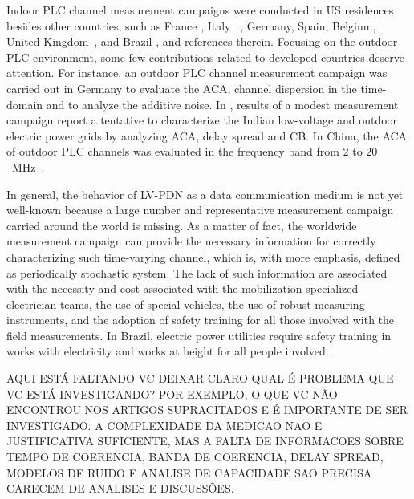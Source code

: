 \documentclass[journal]{IEEEtran}
\begin{document}
Indoor \ac{PLC} channel measurement campaigns were conducted in US residences \cite{Liu1999, O'Mahony2006} besides other countries, such as France \cite{Tlich2008,Tlich2008a,Schneider2012}, Italy ~\cite{Tonello2014}, Germany, Spain, Belgium, United Kingdom~\cite{Schneider2012}, and Brazil \cite{Oliveira2017}, and references therein. Focusing on the outdoor \ac{PLC} environment, some few contributions related to developed countries deserve attention. For instance, an outdoor \ac{PLC} channel measurement campaign was carried out in Germany to evaluate the \ac{ACA}, channel dispersion in the time-domain and to analyze the additive noise. In \cite{Prasad2001}, results of a modest measurement campaign report a tentative to characterize the Indian low-voltage and outdoor electric power grids by analyzing  \ac{ACA}, delay spread and \ac{CB}. In China, the \ac{ACA} of outdoor \ac{PLC} channels was evaluated in the frequency band from $2$ to $20$~MHz~\cite{Zhai2011}.\color{black}

\color{red} In general, the behavior of \ac{LV-PDN} as a data communication medium is not yet well-known because a large number and representative measurement campaign carried around the world is missing. As a matter of fact, the worldwide measurement campaign can provide the necessary information for correctly characterizing such time-varying channel, which is, with more emphasis, defined as periodically stochastic system. The lack of such information are associated with the necessity and cost associated with the mobilization specialized electrician teams, the use of special vehicles, the use of robust measuring instruments, and the adoption of safety training for all those involved with the field measurements. In Brazil, electric power utilities require safety training in works with electricity \cite{NR10} and works at height \cite{NR35} for all people involved. 

AQUI ESTÁ FALTANDO VC DEIXAR CLARO QUAL É PROBLEMA QUE VC ESTÁ INVESTIGANDO? POR EXEMPLO, O QUE VC NÃO ENCONTROU NOS ARTIGOS SUPRACITADOS E É IMPORTANTE DE SER INVESTIGADO. A COMPLEXIDADE DA MEDICAO NAO E JUSTIFICATIVA SUFICIENTE, MAS A FALTA DE INFORMACOES SOBRE TEMPO DE COERENCIA, BANDA DE COERENCIA, DELAY SPREAD, MODELOS DE RUIDO E ANALISE DE CAPACIDADE SAO PRECISA CARECEM DE ANALISES E DISCUSSÕES.
\end{document}
